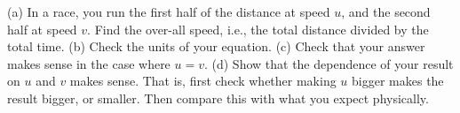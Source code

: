(a) In a race, you run the first half of the distance at speed $u$,
and the second half at speed $v$. Find the over-all speed, i.e.,
the total distance divided by the total time.\answercheck\hwendpart
%
(b) Check the units of your equation.\hwendpart
%
(c) Check that your answer makes sense in the case where $u=v$.\hwendpart
%
(d) Show that the dependence of your result on $u$ and $v$ makes sense. That is, first
check whether making $u$ bigger makes the result bigger, or smaller. Then compare this
with what you expect physically.
